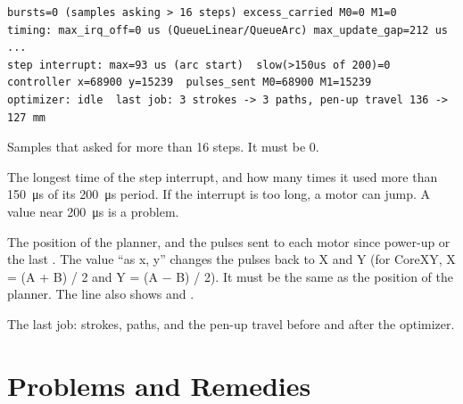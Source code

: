 \begin{lstlisting}[language=console]
bursts=0 (samples asking > 16 steps) excess_carried M0=0 M1=0
timing: max_irq_off=0 us (QueueLinear/QueueArc) max_update_gap=212 us ...
step interrupt: max=93 us (arc start)  slow(>150us of 200)=0
controller x=68900 y=15239  pulses_sent M0=68900 M1=15239
optimizer: idle  last job: 3 strokes -> 3 paths, pen-up travel 136 -> 127 mm
\end{lstlisting}

\begin{description}[style=nextline,leftmargin=1.2em,font=\sffamily\bfseries\color{navy}]
  \item[bursts] Samples that asked for more than 16 steps. It must be 0.
  \item[step interrupt] The longest time of the step interrupt, and how many
        times it used more than \SI{150}{\micro s} of its \SI{200}{\micro s}
        period. If the interrupt is too long, a motor can jump. A value near
        \SI{200}{\micro s} is a problem.
  \item[controller, pulses\_sent] The position of the planner, and the pulses
        sent to each motor since power-up or the last . The value
        ``as x, y'' changes the pulses back to X and Y (for CoreXY,
        X = (A + B) / 2 and Y = (A $-$ B) / 2). It must be the same as the
        position of the planner. The line also shows  and
        .
  \item[optimizer] The last job: strokes, paths, and the pen-up travel before
        and after the optimizer.
\end{description}

\section{Problems and Remedies}

